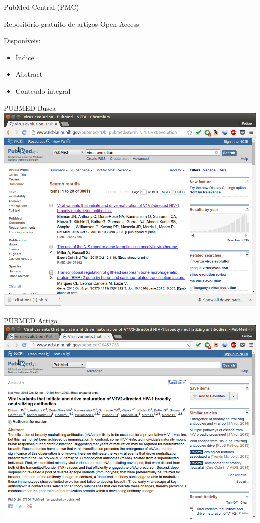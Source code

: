 \documentclass{beamer}
\begin{document}
\begin{frame}{PubMed Central (PMC)}
  \begin{definition}
    Repositório gratuito de artigos Open-Access
  \end{definition}
  Disponíveis:
  \begin{itemize}
  \item Índice
  \item Abstract
  \item Conteúdo integral
  \end{itemize}
\end{frame}

\begin{frame}{PUBMED Busca}
  \includegraphics[height=.85\textheight]{Busca/pubmed-busca}
\end{frame}

\begin{frame}{PUBMED Artigo}
  \includegraphics[height=.85\textheight]{Busca/pubmed-paper}
\end{frame}
\end{document}
